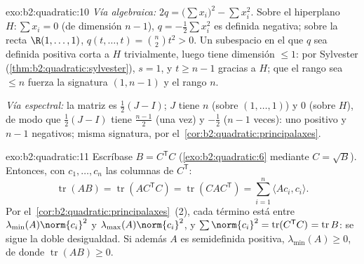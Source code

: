 \begin{solution}{exo:b2:quadratic:10}
\emph{Vía algebraica:} $2q = \bigl(\sum x_i\bigr)^2 - \sum x_i^2$.
Sobre el hiperplano $H : \sum x_i = 0$ (de dimensión $n - 1$), $q =
-\frac12\sum x_i^2$ es definida negativa; sobre la recta $\R(1, \dots,
1)$, $q(t, \dots, t) = \binom n2 t^2 > 0$. Un subespacio en el que $q$
sea definida positiva corta a $H$ trivialmente, luego tiene dimensión
$\leq 1$: por Sylvester (\cref{thm:b2:quadratic:sylvester}), $s = 1$, y
$t \geq n-1$ gracias a $H$; que el rango sea $\leq n$ fuerza la
signatura $(1, n-1)$ y el rango $n$.

\emph{Vía espectral:} la matriz es $\frac12(J - I)$; $J$ tiene
 $n$ (sobre $(1,\dots,1)$) y $0$ (sobre $H$), de modo
que $\frac12(J-I)$ tiene  $\frac{n-1}{2}$ (una vez) y
$-\frac12$ ($n-1$ veces): uno positivo y $n-1$ negativos; misma
signatura, por el~\cref{cor:b2:quadratic:principalaxes}.
\end{solution}

\begin{solution}{exo:b2:quadratic:11}
Escríbase $B = C^{\mathsf T}C$ (\cref{exo:b2:quadratic:6} mediante $C =
\sqrt B$). Entonces, con $c_1, \dots, c_n$ las columnas de $C^{\mathsf
T}$:
\[
\operatorname{tr}(AB) = \operatorname{tr}(AC^{\mathsf T}C)
= \operatorname{tr}(CAC^{\mathsf T})
= \sum_{i=1}^n \langle A c_i, c_i\rangle .
\]
Por el~\cref{cor:b2:quadratic:principalaxes}~(2), cada término está
entre $\lambda_{\min}(A)\norm{c_i}^2$ y $\lambda_{\max}(A)
\norm{c_i}^2$, y $\sum\norm{c_i}^2 = \operatorname{tr}(C^{\mathsf
T}C)^{\vphantom1} = \operatorname{tr} B$: se sigue la doble desigualdad.
Si además $A$ es semidefinida positiva, $\lambda_{\min}(A) \geq 0$, de
donde $\operatorname{tr}(AB) \geq 0$.
\end{solution}

